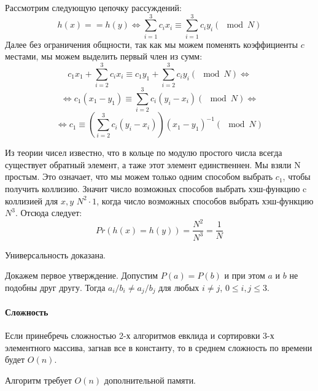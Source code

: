 \documentclass[12pt]{article}
\begin{document}
Рассмотрим следующую цепочку рассуждений:
$$
h(x) == h(y) \Leftrightarrow \sum\limits_{i = 1}^3 c_i x_i
\equiv \sum\limits_{i = 1}^3 c_i y_i (\mod N)
$$
Далее без ограничения общности, так как мы можем поменять
коэффициенты $ c $ местами, мы можем выделить первый член из сумм:
$$
c_1 x_1 + \sum\limits_{i = 2}^3 c_i x_i \equiv
c_1 y_1 + \sum\limits_{i = 2}^3 c_i y_i (\mod N)
\Leftrightarrow
$$
$$
\Leftrightarrow
c_1(x_1 - y_1) \equiv \sum\limits_{i = 2}^3 c_i (y_i - x_i) (\mod N)
\Leftrightarrow
$$
$$
\Leftrightarrow
c_1 \equiv \left(\sum\limits_{i = 2}^3 c_i (y_i - x_i)\right)
(x_1 - y_1)^{-1} (\mod N)
$$

Из теории чисел известно, что в кольце по модулю простого числа всегда
существует обратный элемент, а таже этот элемент единственнен. Мы взяли
N простым. Это означает, что мы можем только одним способом выбрать $ c_1 $,
чтобы получить коллизию. Значит число возможных способов выбрать хэш-функцию
c коллизией для $ x, y $ $ N^2 \cdot 1 $, когда число возможных способов
выбрать хэш-функцию $ N^3 $. Отсюда следует:
$$
Pr(h(x) = h(y)) = \frac{N^2}{N^3} = \frac{1}{N}
$$

Универсальность доказана.

Докажем первое утверждение. Допустим $ P(a) = P(b) $ и при этом $ a $ и $ b $
не подобны друг другу. Тогда $ a_i / b_i \ne a_j / b_j $ для любых $ i \ne j $,
$ 0 \le i, j \le 3 $. 



\paragraph{Сложность}
Если принебречь сложностью 2-х алгоритмов евклида и сортировки 3-х
элементного массива, загнав все в константу, то в среднем сложность
по времени будет $ O(n) $.

Алгоритм требует $ O(n) $ дополнительной памяти.
\end{document}

